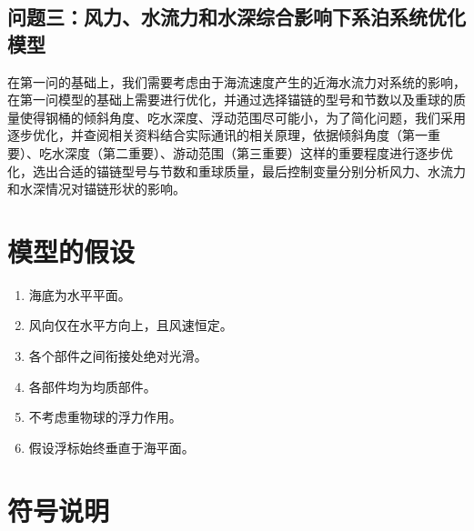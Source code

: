 \documentclass[withoutpreface,bwprint]{cumcmthesis} %
\begin{document}
\subsection{问题三：风力、水流力和水深综合影响下系泊系统优化模型}
在第一问的基础上，我们需要考虑由于海流速度产生的近海水流力对系统的影响，在第一问模型的基础上需要进行优化，并通过选择锚链的型号和节数以及重球的质量使得钢桶的倾斜角度、吃水深度、浮动范围尽可能小，为了简化问题，我们采用逐步优化，并查阅相关资料结合实际通讯的相关原理，依据倾斜角度（第一重要）、吃水深度（第二重要）、游动范围（第三重要）这样的重要程度进行逐步优化，选出合适的锚链型号与节数和重球质量，最后控制变量分别分析风力、水流力和水深情况对锚链形状的影响。
\section{模型的假设}

\begin{enumerate}
	\item 海底为水平平面。
	\item 风向仅在水平方向上，且风速恒定。
	\item 各个部件之间衔接处绝对光滑。
	\item 各部件均为均质部件。
	\item 不考虑重物球的浮力作用。
	\item 假设浮标始终垂直于海平面。
\end{enumerate}

\newpage
\section{符号说明}
\end{document}
